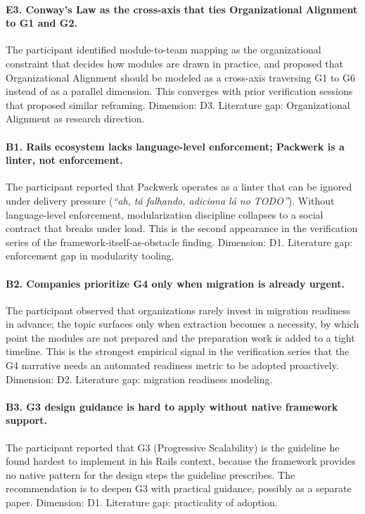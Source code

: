 \paragraph*{E3. Conway's Law as the cross-axis that ties Organizational Alignment to G1 and G2.} The participant identified module-to-team mapping as the organizational constraint that decides how modules are drawn in practice, and proposed that Organizational Alignment should be modeled as a cross-axis traversing G1 to G6 instead of as a parallel dimension. This converges with prior verification sessions that proposed similar reframing. Dimension: D3. Literature gap: Organizational Alignment as research direction.

\paragraph*{B1. Rails ecosystem lacks language-level enforcement; Packwerk is a linter, not enforcement.} The participant reported that Packwerk operates as a linter that can be ignored under delivery pressure (\textit{``ah, tá falhando, adiciona lá no TODO''}). Without language-level enforcement, modularization discipline collapses to a social contract that breaks under load. This is the second appearance in the verification series of the framework-itself-as-obstacle finding. Dimension: D1. Literature gap: enforcement gap in modularity tooling.

\paragraph*{B2. Companies prioritize G4 only when migration is already urgent.} The participant observed that organizations rarely invest in migration readiness in advance; the topic surfaces only when extraction becomes a necessity, by which point the modules are not prepared and the preparation work is added to a tight timeline. This is the strongest empirical signal in the verification series that the G4 narrative needs an automated readiness metric to be adopted proactively. Dimension: D2. Literature gap: migration readiness modeling.

\paragraph*{B3. G3 design guidance is hard to apply without native framework support.} The participant reported that G3 (Progressive Scalability) is the guideline he found hardest to implement in his Rails context, because the framework provides no native pattern for the design steps the guideline prescribes. The recommendation is to deepen G3 with practical guidance, possibly as a separate paper. Dimension: D1. Literature gap: practicality of adoption.

